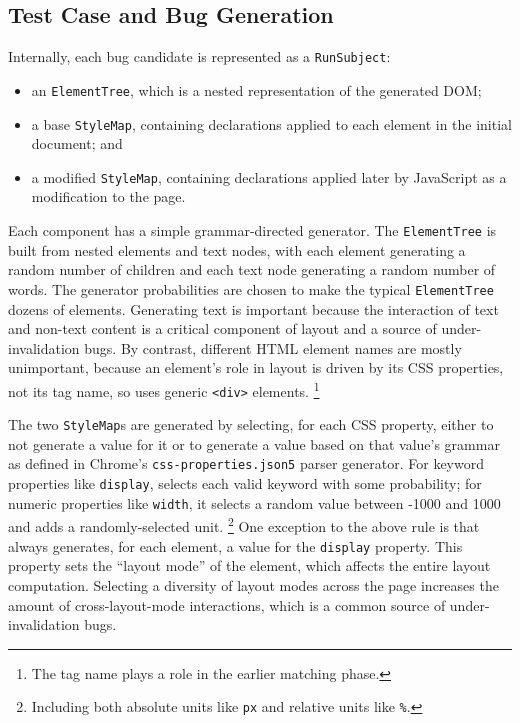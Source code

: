 \subsection{Test Case and Bug Generation}

Internally, each \toolname bug candidate is represented as a \texttt{RunSubject}:

\begin{itemize}
    \item an \texttt{ElementTree}, which is a nested representation of the
    generated DOM;
    \item a base \texttt{StyleMap}, containing declarations applied
      to each element in the initial document; and
    \item a modified \texttt{StyleMap}, containing declarations applied
      later by JavaScript as a modification to the page.
\end{itemize}

Each component has a simple grammar-directed generator.
The \texttt{ElementTree} is built from
  nested elements and text nodes,
  with each element generating a random number of children
  and each text node generating a random number of words.
The generator probabilities are chosen
  to make the typical \texttt{ElementTree} dozens of elements.
Generating text is important because the interaction of text and non-text content
  is a critical component of layout and a source of under-invalidation bugs.
By contrast, different HTML element names are mostly unimportant,
  because an element's role in layout is driven by
  its CSS properties, not its tag name,
  so \toolname uses generic \texttt{<div>} elements.%
\footnote{The tag name plays a role in the earlier matching phase.}

The two \texttt{StyleMap}s are generated by selecting,
  for each CSS property, either to not generate a value for it
  or to generate a value based on that value's grammar
  as defined in Chrome's \texttt{css-properties.json5} parser generator.
For keyword properties like \texttt{display},
  \toolname selects each valid keyword with some probability;
  for numeric properties like \texttt{width},
  it selects a random value between -1000 and 1000
  and adds a randomly-selected unit.%
\footnote{Including both absolute units like \texttt{px}
  and relative units like \texttt{\%}.}
One exception to the above rule is that \toolname
  always generates, for each element,
  a value for the \texttt{display} property.
This property sets the ``layout mode'' of the element,
  which affects the entire layout computation.
Selecting a diversity of layout modes across the page
  increases the amount of cross-layout-mode interactions,
  which is a common source of under-invalidation bugs.


